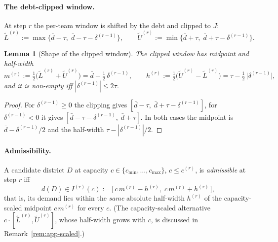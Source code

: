 \documentclass[preprint,12pt,authoryear]{elsarticle}
\newtheorem{lemma}[theorem]{Lemma}
\theoremstyle{definition}
\begin{document}
\paragraph{The debt-clipped window.}
At step $r$ the per-team window is shifted by the debt and clipped to $J$:
\begin{equation}\label{eq:app-clip}
  \widetilde L^{(r)} := \max\{\bar d-\tau,\;\bar d-\tau-\delta^{(r-1)}\},\qquad
  \widetilde U^{(r)} := \min\{\bar d+\tau,\;\bar d+\tau-\delta^{(r-1)}\}.
\end{equation}

\begin{lemma}[Shape of the clipped window]\label{lem:app-shape}\label{cor:feas-condition}\label{cor:debt-consequences}
The clipped window has midpoint and half-width
\begin{equation}\label{eq:app-mh}
  m^{(r)} := \tfrac12\bigl(\widetilde L^{(r)}+\widetilde U^{(r)}\bigr)
           = \bar d-\tfrac12\,\delta^{(r-1)},\qquad
  h^{(r)} := \tfrac12\bigl(\widetilde U^{(r)}-\widetilde L^{(r)}\bigr)
           = \tau-\tfrac12\,\bigl|\delta^{(r-1)}\bigr|,
\end{equation}
and it is non-empty iff $|\delta^{(r-1)}|\le 2\tau$.
\end{lemma}
\begin{proof}
For $\delta^{(r-1)}\ge 0$ the clipping gives
$[\bar d-\tau,\;\bar d+\tau-\delta^{(r-1)}]$, for $\delta^{(r-1)}<0$ it gives $[\bar d-\tau-\delta^{(r-1)},\;\bar d+\tau]$. In both cases the midpoint is
$\bar d-\delta^{(r-1)}/2$ and the half-width $\tau-|\delta^{(r-1)}|/2$.
\end{proof}

\paragraph{Admissibility.}
A candidate district $D$ at capacity $c\in\{c_{\min},\ldots,c_{\max}\}$,
$c\le c^{(r)}$, is \emph{admissible} at step $r$ iff
\begin{equation}\label{eq:app-window}
  d(D)\in I^{(r)}(c) := \bigl[\,c\,m^{(r)}-h^{(r)},\; c\,m^{(r)}+h^{(r)}\,\bigr],
\end{equation}
that is, its demand lies within the \emph{same} absolute half-width
$h^{(r)}$ of the capacity-scaled midpoint $c\,m^{(r)}$ for every $c$.
(The capacity-scaled alternative $c\cdot[\widetilde L^{(r)},\widetilde U^{(r)}]$,
whose half-width grows with $c$, is discussed in Remark~\ref{rem:app-scaled}.)
\end{document}
